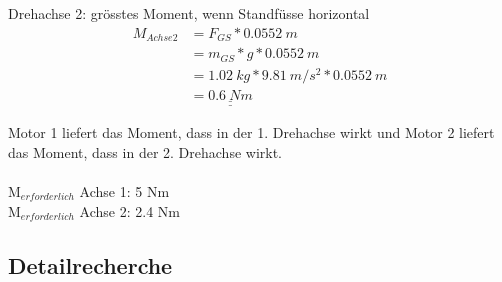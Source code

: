 Drehachse 2: grösstes Moment, wenn Standfüsse horizontal
\begin{align*}
    M_{Achse 2} &= F_{GS} * 0.0552\ m \\
    &= m_{GS} * g * 0.0552\ m \\
    &= 1.02\ kg * 9.81\ m/s^2 * 0.0552\ m \\
    &=\underline{\underline{0.6\ Nm}}
\end{align*}

Motor 1 liefert das Moment, dass in der 1. Drehachse wirkt und Motor 2 liefert das Moment, dass in der 2. Drehachse wirkt.\\
\\
M$_{erforderlich}$ Achse 1: 5 Nm\\

M$_{erforderlich}$ Achse 2: 2.4 Nm





\subsection*{Detailrecherche}







